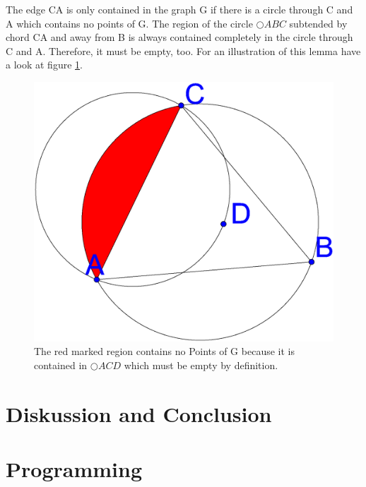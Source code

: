 \documentclass[a4paper,twoside, onecolumn]{IEEEtran}
\begin{document}
The edge CA is only contained in the graph G if there is a circle through C and A which contains no points of G.
The region of the circle $\bigcirc{ABC} $ subtended by chord CA and away from B is always contained completely in the circle through C and A.
Therefore, it must be empty, too.
For an illustration of this lemma have a look at figure \ref{fig:region}.


\begin{figure}[h!]
\centering
\includegraphics[width=0.2\linewidth]{noPointinRegion.eps}
\caption{The red marked region contains no Points of G because it is contained in $\bigcirc{ACD} $ which must be empty by definition.}
\label{fig:region}
\end{figure}

\section{Diskussion and Conclusion}

\section{Programming}



\end{document}
